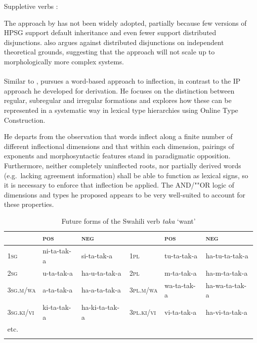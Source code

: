 \documentclass[output=paper
 	        ,biblatex
                ,babelshorthands
                ,newtxmath
                ,draftmode
                ,colorlinks, citecolor=brown
]{langscibook}
\begin{document}
\ea
\label{ex-DistrDisjSupp}
Suppletive verbs \citep[106]{Krieger:Nerbonne:93}:\\
\z

The approach by \citet{Krieger:Nerbonne:93} has not been widely
adopted, partially because few versions of HPSG support default
inheritance and even fewer support distributed
disjunctions. \citet[176--178]{Koenig99} also argues against distributed
disjunctions on independent theoretical grounds, suggesting that the
approach will not scale up to morphologically more complex systems.  

\paragraph*{\citet{Koenig99}}

Similar to \citet{Krieger:Nerbonne:93}, \citet{Koenig99} pursues a
word-based approach to inflection, in contrast to the IP approach he
developed for derivation. He focuses on the distinction between
regular, subregular and irregular formations and explores how these
can be represented in a systematic way in lexical type hierarchies
using Online Type Construction.

He departs from the observation that words  inflect along a finite number
of different inflectional dimensions and that within each dimension,
pairings of exponents and morphosyntactic features stand in
paradigmatic opposition. Furthermore, neither completely uninflected
roots, nor partially derived words (e.g.\ lacking agreement
information) shall be able to function as lexical signs, so it is
necessary to enforce that inflection be applied. The AND/""OR
logic of dimensions and types he proposed appears to be very
well-suited to account for these properties. 

\begin{table}
\setlength{\tabcolsep}{.3em}
\centering
\begin{tabular}{llllll}
\lsptoprule 
 & \textsc{pos} & \textsc{neg}     &             & \textsc{pos} & \textsc{neg}\\
\midrule 
\textsc{1sg}       & ni-{ta}-tak-{a} & {si}-{ta}-tak-{a}    & \textsc{1pl} & tu-{ta}-tak-{a}     & {ha}-tu-{ta}-tak-{a}\\
\textsc{2sg}       & u-{ta}-tak-{a}  & {ha}-u-{ta}-tak-{a}  & \textsc{2pl} & m-{ta}-tak-{a}      & {ha}-m-{ta}-tak-{a}\\
\textsc{3sg.m/wa}  & a-{ta}-tak-{a}  & {ha}-a-{ta}-tak-{a}  & \textsc{3pl.m/wa} & wa-{ta}-tak-{a} & {ha}-wa-{ta}-tak-{a}\\ 
\textsc{3sg.ki/vi} & ki-{ta}-tak-{a} & {ha}-ki-{ta}-tak-{a} & \textsc{3pl.ki/vi} & vi-{ta}-tak-{a} & {ha}-vi-{ta}-tak-{a}\\
etc. & &\\
\lspbottomrule
\end{tabular}
\caption{Future forms of the Swahili verb  \textit{taka} ‘want’}
\label{tab:SwahiliPast}
\end{table}
\end{document}
